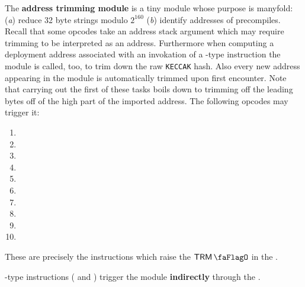 The \textbf{address trimming module} is a tiny module whose purpose is manyfold:
(\emph{a})
reduce 32 byte strings modulo $2^{160}$
(\emph{b})
identify addresses of precompiles.
Recall that some opcodes take an address stack argument which may require trimming to be interpreted as an address.
Furthermore when computing a deployment address associated with an invokation of a -type instruction the \rlpAddrMod{} module is called, too, to trim down the raw \texttt{KECCAK} hash.
Also every new address appearing in the \hubMod{} module is automatically trimmed upon first encounter.
Note that carrying out the first of these tasks boils down to trimming off the leading bytes off of the high part of the imported address. The following opcodes may trigger it:
\begin{multicols}{4}
\begin{enumerate}
	\item {}
	\item {}
	\item {}
	\item {}
	\item {}
	\item {}
	\item {}
	\item {}
	\item {}
	\item[\vspace{\fill}]
\end{enumerate}
\end{multicols}
These are precisely the instructions which raise the $\trmFlag$ in the \hubMod{}.

\saNote{} -type instructions ( and ) trigger the \trmMod{} module \textbf{indirectly} through the \rlpAddrMod{}.
